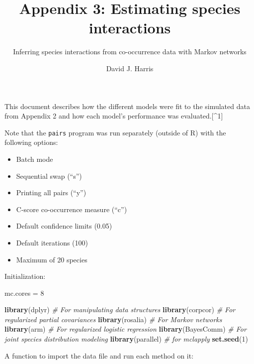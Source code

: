 \documentclass[11pt,]{article}
\title{Appendix 3: Estimating species interactions}
\subtitle{Inferring species interactions from co-occurrence data with Markov
networks}
\author{David J. Harris}
\date{}
\newenvironment{Shaded}{\begin{snugshade}}{\end{snugshade}}
\newcommand{\KeywordTok}[1]{\textcolor[rgb]{0.13,0.29,0.53}{\textbf{{#1}}}}
\newcommand{\DecValTok}[1]{\textcolor[rgb]{0.00,0.00,0.81}{{#1}}}
\newcommand{\StringTok}[1]{\textcolor[rgb]{0.31,0.60,0.02}{{#1}}}
\newcommand{\CommentTok}[1]{\textcolor[rgb]{0.56,0.35,0.01}{\textit{{#1}}}}
\newcommand{\NormalTok}[1]{{#1}}
\providecommand{\tightlist}{%
  \setlength{\itemsep}{0pt}\setlength{\parskip}{0pt}}
\begin{document}
\maketitle

This document describes how the different models were fit to the
simulated data from Appendix 2 and how each model's performance was
evaluated.{[}\^{}1{]}

Note that the \texttt{pairs} program was run separately (outside of R)
with the following options:

\begin{itemize}
\tightlist
\item
  Batch mode
\item
  Sequential swap (``s'')
\item
  Printing all pairs (``y'')
\item
  C-score co-occurrence measure (``c'')
\item
  Default confidence limits (0.05)
\item
  Default iterations (100)
\item
  Maximum of 20 species
\end{itemize}

Initialization:

\begin{Shaded}
\begin{Highlighting}[]
\NormalTok{mc.cores =}\StringTok{ }\DecValTok{8}

\KeywordTok{library}\NormalTok{(dplyr)        }\CommentTok{# For manipulating data structures}
\KeywordTok{library}\NormalTok{(corpcor)      }\CommentTok{# For regularized partial covariances}
\KeywordTok{library}\NormalTok{(rosalia)      }\CommentTok{# For Markov networks}
\KeywordTok{library}\NormalTok{(arm)          }\CommentTok{# For regularized logistic regression}
\KeywordTok{library}\NormalTok{(BayesComm)    }\CommentTok{# For joint species distribution modeling}
\KeywordTok{library}\NormalTok{(parallel)     }\CommentTok{# for mclapply}
\KeywordTok{set.seed}\NormalTok{(}\DecValTok{1}\NormalTok{)}
\end{Highlighting}
\end{Shaded}

A function to import the data file and run each method on it:
\end{document}
